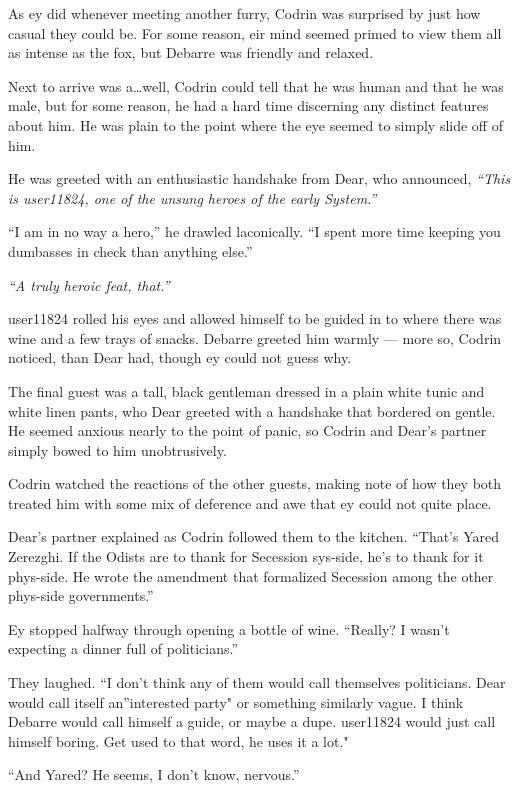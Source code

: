 As ey did whenever meeting another furry, Codrin was surprised by just how casual they could be. For some reason, eir mind seemed primed to view them all as intense as the fox, but Debarre was friendly and relaxed.

Next to arrive was a\ldots well, Codrin could tell that he was human and that he was male, but for some reason, he had a hard time discerning any distinct features about him. He was plain to the point where the eye seemed to simply slide off of him.

He was greeted with an enthusiastic handshake from Dear, who announced, \emph{``This is user11824, one of the unsung heroes of the early System.''}

``I am in no way a hero,'' he drawled laconically. ``I spent more time keeping you dumbasses in check than anything else.''

\emph{``A truly heroic feat, that.''}

user11824 rolled his eyes and allowed himself to be guided in to where there was wine and a few trays of snacks. Debarre greeted him warmly — more so, Codrin noticed, than Dear had, though ey could not guess why.

The final guest was a tall, black gentleman dressed in a plain white tunic and white linen pants, who Dear greeted with a handshake that bordered on gentle. He seemed anxious nearly to the point of panic, so Codrin and Dear's partner simply bowed to him unobtrusively.

Codrin watched the reactions of the other guests, making note of how they both treated him with some mix of deference and awe that ey could not quite place.

Dear's partner explained as Codrin followed them to the kitchen. ``That's Yared Zerezghi. If the Odists are to thank for Secession sys-side, he's to thank for it phys-side. He wrote the amendment that formalized Secession among the other phys-side governments.''

Ey stopped halfway through opening a bottle of wine. ``Really? I wasn't expecting a dinner full of politicians.''

They laughed. ``I don't think any of them would call themselves politicians. Dear would call itself an''interested party" or something similarly vague. I think Debarre would call himself a guide, or maybe a dupe. user11824 would just call himself boring. Get used to that word, he uses it a lot."

``And Yared? He seems, I don't know, nervous.''

